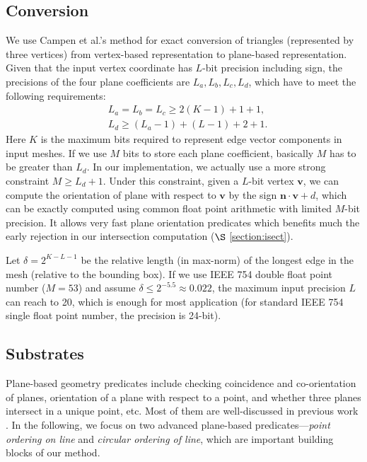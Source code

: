 \documentclass[10pt,journal,compsoc]{IEEEtran}
\begin{document}
\subsection{Conversion}

\label{sec:convert}

We use Campen et al.'s method \cite{campen2010exact} for exact conversion of triangles (represented by three vertices) from vertex-based representation to plane-based representation. Given that the input vertex coordinate has $L$-bit precision including sign, the precisions of the four plane coefficients are $L_a, L_b, L_c, L_d$, which have to meet the following requirements:
\begin{equation}
\begin{split}
&L_a=L_b=L_c\ge 2(K-1)+1+1,\\
&L_d\ge(L_a-1)+(L-1)+2+1.
\end{split}
\end{equation}
Here $K$ is the maximum bits required to represent edge vector components in input meshes. If we use $M$ bits to store each plane coefficient, basically $M$ has to be greater than $L_d$. In our implementation, we actually use a more strong constraint $M \ge L_d+1$. Under this constraint, given a $L$-bit vertex $\bm{v}$, we can compute the orientation of plane with respect to $\bm{v}$ by the sign $\bm{n}\cdot\bm{v} + d$, which can be exactly computed using common float point arithmetic with limited $M$-bit precision. It allows very fast plane orientation predicates which benefits much the early rejection in our intersection computation ($\S$ \ref{section:isect}).


Let $\delta = 2^{K-L-1}$ be the relative length (in max-norm) of the longest edge in the mesh (relative to the bounding box). If we use IEEE 754 double float point number ($M=53$) and assume $\delta \le 2^{-5.5} \approx 0.022$, the maximum input precision $L$ can reach to 20, which is enough for most application (for standard IEEE 754 single float point number, the precision is 24-bit).


\subsection{Substrates}
\label{sec:substrates}
Plane-based geometry predicates include checking coincidence and co-orientation of planes, orientation of a plane with respect to a point, and whether three planes intersect in a unique point, etc. Most of them are well-discussed in previous work \cite{bernstein2009fast,banerjee1996topologically}. In the following, we focus on two advanced plane-based predicates---\emph{point ordering on line} and \emph{circular ordering of line}, which are important building blocks of our method.
\end{document}

